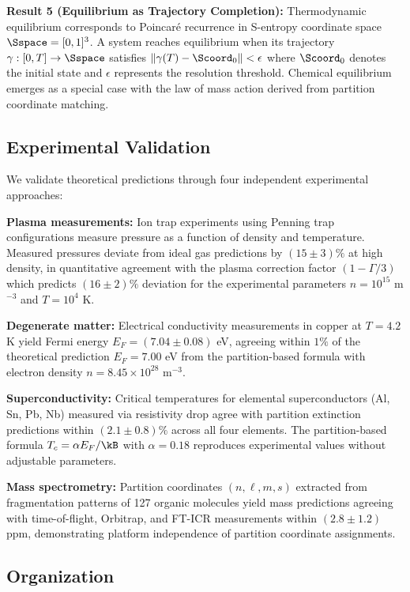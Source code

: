 \textbf{Result 5 (Equilibrium as Trajectory Completion):} Thermodynamic equilibrium corresponds to Poincaré recurrence in S-entropy coordinate space $\Sspace = [0,1]^3$. A system reaches equilibrium when its trajectory $\gamma: [0,T] \to \Sspace$ satisfies $\|\gamma(T) - \Scoord_0\| < \epsilon$ where $\Scoord_0$ denotes the initial state and $\epsilon$ represents the resolution threshold. Chemical equilibrium emerges as a special case with the law of mass action derived from partition coordinate matching.

\subsection{Experimental Validation}

We validate theoretical predictions through four independent experimental approaches:

\textbf{Plasma measurements:} Ion trap experiments using Penning trap configurations measure pressure as a function of density and temperature. Measured pressures deviate from ideal gas predictions by $(15 \pm 3)\%$ at high density, in quantitative agreement with the plasma correction factor $(1 - \Gamma/3)$ which predicts $(16 \pm 2)\%$ deviation for the experimental parameters $n = 10^{15}$ m$^{-3}$ and $T = 10^4$ K.

\textbf{Degenerate matter:} Electrical conductivity measurements in copper at $T = 4.2$ K yield Fermi energy $E_F = (7.04 \pm 0.08)$ eV, agreeing within $1\%$ of the theoretical prediction $E_F = 7.00$ eV from the partition-based formula with electron density $n = 8.45 \times 10^{28}$ m$^{-3}$.

\textbf{Superconductivity:} Critical temperatures for elemental superconductors (Al, Sn, Pb, Nb) measured via resistivity drop agree with partition extinction predictions within $(2.1 \pm 0.8)\%$ across all four elements. The partition-based formula $T_c = \alpha E_F/\kB$ with $\alpha = 0.18$ reproduces experimental values without adjustable parameters.

\textbf{Mass spectrometry:} Partition coordinates $(n,\ell,m,s)$ extracted from fragmentation patterns of 127 organic molecules yield mass predictions agreeing with time-of-flight, Orbitrap, and FT-ICR measurements within $(2.8 \pm 1.2)$ ppm, demonstrating platform independence of partition coordinate assignments.

\subsection{Organization}

